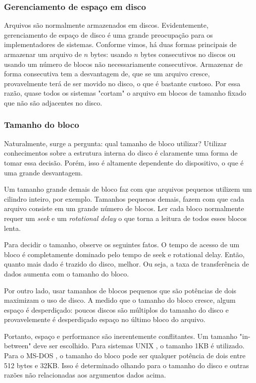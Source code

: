 \documentclass{article}
\newcommand\unix{{\color{red}UNIX} }
\newcommand\msdos{{\color{yellow}MS-DOS} }
\begin{document}
\subsubsection{Gerenciamento de espaço em disco}

Arquivos são normalmente armazenados em discos. Evidentemente, gerenciamento de espaço de disco é uma grande preocupação para os implementadores de sistemas. Conforme vimos, há duas formas principais de armazenar um arquivo de $n$ bytes: usando $n$ bytes consecutivos no discos ou usando um número de blocos não necessariamente consecutivos. Armazenar de forma consecutiva tem a desvantagem de, que se um arquivo cresce, provavelmente terá de ser movido no disco, o que é bastante custoso. Por essa razão, quase todos os sistemas "cortam" o arquivo em blocos de tamanho fixado que não são adjacentes no disco.

\subsubsection{Tamanho do bloco}

Naturalmente, surge a pergunta: qual tamanho de bloco utilizar? Utilizar conhecimentos sobre a estrutura interna do disco é claramente uma forma de tomar essa decisão. Porém, isso é altamente dependente do dispositivo, o que é uma grande desvantagem. 

Um tamanho grande demais de bloco faz com que arquivos pequenos utilizem um cilindro inteiro, por exemplo. Tamanhos pequenos demais, fazem com que cada arquivo consiste em um grande número de blocos. Ler cada bloco normalmente requer um \textit{seek} e um \textit{rotational delay} o que torna a leitura de todos esses blocos lenta.

Para decidir o tamanho, observe os seguintes fatos. O tempo de acesso de um bloco é completamente dominado pelo tempo de seek e rotational delay. Então, quanto mais dado é trazido do disco, melhor. Ou seja, a taxa de transferência de dados aumenta com o tamanho do bloco. 

Por outro lado, usar tamanhos de blocos pequenos que são potências de dois maximizam o uso de disco. A medido que o tamanho do bloco cresce, algum espaço é desperdiçado: poucos discos são múltiplos do tamanho do disco e provavelemente é desperdiçado espaço no último bloco do arquivo.

Portanto, espaço e performance são inerentemente conflitantes. Um tamanho "in-between" deve ser escolhido. Para sistemas \unix, o tamanho 1KB é utilizado. Para o \msdos, o tamanho do bloco pode ser qualquer potência de dois entre 512 bytes e 32KB. Isso é determinado olhando para o tamanho do disco e outras razões não relacionadas aos argumentos dados acima.
\end{document}
